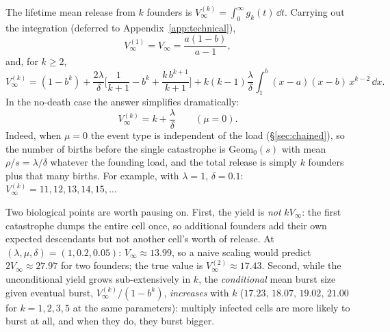 The lifetime mean release from $k$ founders is
$V_\infty^{(k)}=\int_0^\infty g_k(t)\,\dd t$. Carrying out the integration
(deferred to Appendix~\ref{app:technical}),
\begin{equation}
V_\infty^{(1)}=V_\infty=\frac{a(1-b)}{a-1},
\end{equation}
and, for $k\ge2$,
\begin{equation}
V_\infty^{(k)}
=(1-b^k)
+\frac{2\lambda}{\delta}\Biggl[\frac{1}{k+1}-b^k+\frac{k\,b^{k+1}}{k+1}\Biggr]
+k(k-1)\frac{\lambda}{\delta}\int_1^b (x-a)(x-b)\,x^{k-2}\,\dd x.
\label{eq:Vk}
\end{equation}
In the no-death case the answer simplifies dramatically:
\begin{equation}
V_\infty^{(k)}=k+\frac{\lambda}{\delta}\qquad(\mu=0).
\label{eq:Vkmu0}
\end{equation}
Indeed, when $\mu=0$ the event type is independent of the load
(\S\ref{sec:chained}), so the number of births before the single catastrophe
is $\mathrm{Geom}_0(s)$ with mean $\rho/s=\lambda/\delta$ whatever the
founding load, and the total release is simply $k$ founders plus that many
births. For example, with $\lambda=1$, $\delta=0.1$:
$V_\infty^{(k)}=11,12,13,14,15,\ldots$

Two biological points are worth pausing on. First, the yield is \emph{not}
$kV_\infty$: the first catastrophe dumps the entire cell once, so additional
founders add their own expected descendants but not another cell's worth of
release. At $(\lambda,\mu,\delta)=(1,0.2,0.05)$: $V_\infty\approx13.99$, so a
naive scaling would predict $2V_\infty\approx27.97$ for two founders; the
true value is $V_\infty^{(2)}\approx17.43$. Second, while the
unconditional yield grows sub-extensively in $k$, the \emph{conditional}
mean burst size given eventual burst, $V_\infty^{(k)}/(1-b^k)$,
\emph{increases} with $k$ ($17.23,\,18.07,\,19.02,\,21.00$ for
$k=1,2,3,5$ at the same parameters): multiply infected cells are more likely
to burst at all, and when they do, they burst bigger.

